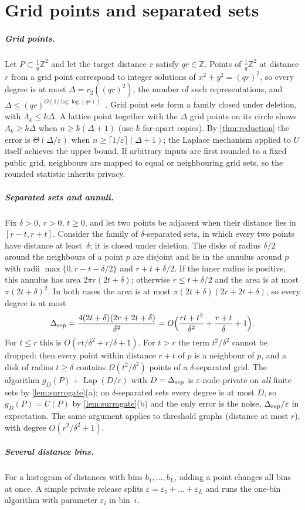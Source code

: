 \documentclass[anonymous,a4paper,USenglish,cleveref,autoref,thm-restate]{socg-lipics-v2021}
\newcommand{\Z}{\mathbb{Z}}
\newcommand{\eps}{\varepsilon}
\newcommand{\Lam}{\Lambda}
\newcommand{\Lap}{\operatorname{Lap}}
\begin{document}
\section{Grid points and separated sets}
\label{app:regimes}

\subparagraph*{Grid points.}
Let $P\subset\frac1q\Z^2$ and let the target distance $r$ satisfy $qr\in\Z$. Points of $\frac1q\Z^2$ at distance $r$ from a grid point correspond to integer solutions of $x^2+y^2=(qr)^2$, so every degree is at most $\Delta=r_2((qr)^2)$, the number of such representations, and $\Delta\le(qr)^{O(1/\log\log(qr))}$~\cite{HardyWright08}. Grid point sets form a family closed under deletion, with $\Lam_k\le k\Delta$. A lattice point together with the $\Delta$ grid points on its circle shows $\Lam_k\ge k\Delta$ when $n\ge k(\Delta+1)$ (use $k$ far-apart copies). By \cref{thm:reduction} the error is $\Theta(\Delta/\eps)$ when $n\ge\lceil1/\eps\rceil(\Delta+1)$; the Laplace mechanism applied to $U$ itself achieves the upper bound. If arbitrary inputs are first rounded to a fixed public grid, neighbours are mapped to equal or neighbouring grid sets, so the rounded statistic inherits privacy.

\subparagraph*{Separated sets and annuli.}
Fix $\delta>0$, $r>0$, $t\ge0$, and let two points be adjacent when their distance lies in $[r-t,r+t]$. Consider the family of $\delta$-separated sets, in which every two points have distance at least~$\delta$; it is closed under deletion. The disks of radius $\delta/2$ around the neighbours of a point $p$ are disjoint and lie in the annulus around $p$ with radii $\max\{0,r-t-\delta/2\}$ and $r+t+\delta/2$. If the inner radius is positive, this annulus has area $2\pi r(2t+\delta)$; otherwise $r\le t+\delta/2$ and the area is at most $\pi(2t+\delta)^2$. In both cases the area is at most $\pi(2t+\delta)(2r+2t+\delta)$, so every degree is at most
\[
  \Delta_{\rm sep}=\frac{4(2t+\delta)(2r+2t+\delta)}{\delta^2}=O\Bigl(\frac{rt+t^2}{\delta^2}+\frac{r+t}{\delta}+1\Bigr).
\]
For $t\le r$ this is $O(rt/\delta^2+r/\delta+1)$. For $t>r$ the term $t^2/\delta^2$ cannot be dropped: then every point within distance $r+t$ of $p$ is a neighbour of $p$, and a disk of radius $t\ge\delta$ contains $\Omega(t^2/\delta^2)$ points of a $\delta$-separated grid. The algorithm $g_D(P)+\Lap(D/\eps)$ with $D=\Delta_{\rm sep}$ is $\eps$-node-private on \emph{all} finite sets by \cref{lem:surrogate}(a); on $\delta$-separated sets every degree is at most $D$, so $g_D(P)=U(P)$ by \cref{lem:surrogate}(b) and the only error is the noise, $\Delta_{\rm sep}/\eps$ in expectation. The same argument applies to threshold graphs (distance at most $r$), with degree $O(r^2/\delta^2+1)$.

\subparagraph*{Several distance bins.}
For a histogram of distances with bins $b_1,\dots,b_L$, adding a point changes all bins at once. A simple private release splits $\eps=\eps_1+\dots+\eps_L$ and runs the one-bin algorithm with parameter $\eps_i$ in bin~$i$.
\end{document}
